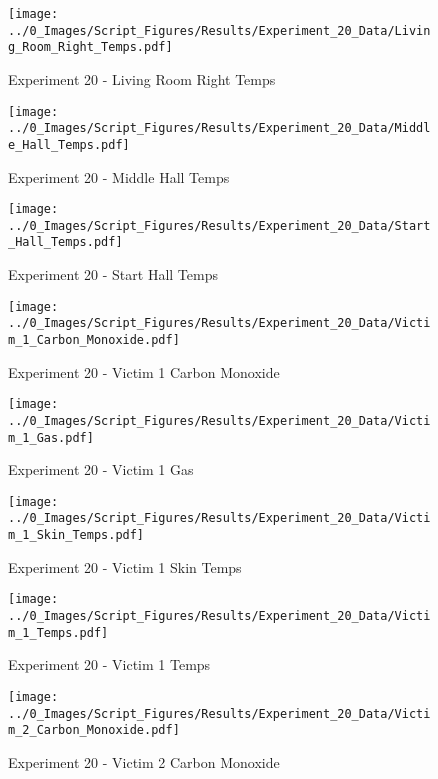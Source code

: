 	\clearpage

	\begin{figure}[H]
		\centering
		\texttt{[image: ../0\_Images/Script\_Figures/Results/Experiment\_20\_Data/Living\_Room\_Right\_Temps.pdf]}
		\caption[]{Experiment 20 - Living Room Right Temps}
	\end{figure}
 

	\begin{figure}[H]
		\centering
		\texttt{[image: ../0\_Images/Script\_Figures/Results/Experiment\_20\_Data/Middle\_Hall\_Temps.pdf]}
		\caption[]{Experiment 20 - Middle Hall Temps}
	\end{figure}
 
	\clearpage

	\begin{figure}[H]
		\centering
		\texttt{[image: ../0\_Images/Script\_Figures/Results/Experiment\_20\_Data/Start\_Hall\_Temps.pdf]}
		\caption[]{Experiment 20 - Start Hall Temps}
	\end{figure}
 

	\begin{figure}[H]
		\centering
		\texttt{[image: ../0\_Images/Script\_Figures/Results/Experiment\_20\_Data/Victim\_1\_Carbon\_Monoxide.pdf]}
		\caption[]{Experiment 20 - Victim 1 Carbon Monoxide}
	\end{figure}
 
	\clearpage

	\begin{figure}[H]
		\centering
		\texttt{[image: ../0\_Images/Script\_Figures/Results/Experiment\_20\_Data/Victim\_1\_Gas.pdf]}
		\caption[]{Experiment 20 - Victim 1 Gas}
	\end{figure}
 

	\begin{figure}[H]
		\centering
		\texttt{[image: ../0\_Images/Script\_Figures/Results/Experiment\_20\_Data/Victim\_1\_Skin\_Temps.pdf]}
		\caption[]{Experiment 20 - Victim 1 Skin Temps}
	\end{figure}
 
	\clearpage

	\begin{figure}[H]
		\centering
		\texttt{[image: ../0\_Images/Script\_Figures/Results/Experiment\_20\_Data/Victim\_1\_Temps.pdf]}
		\caption[]{Experiment 20 - Victim 1 Temps}
	\end{figure}
 

	\begin{figure}[H]
		\centering
		\texttt{[image: ../0\_Images/Script\_Figures/Results/Experiment\_20\_Data/Victim\_2\_Carbon\_Monoxide.pdf]}
		\caption[]{Experiment 20 - Victim 2 Carbon Monoxide}
	\end{figure}
 
